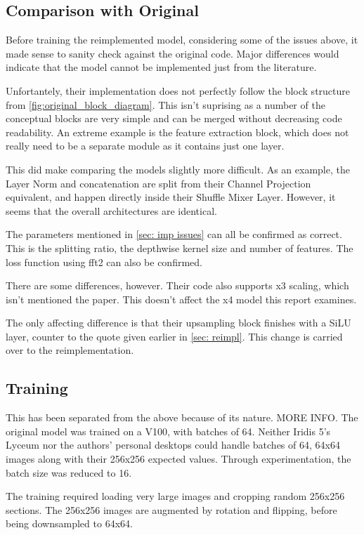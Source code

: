 \documentclass{article}
\begin{document}
    \subsection{Comparison with Original}

    Before training the reimplemented model, considering some of the issues above, it made sense to sanity check against the original code. Major differences would indicate that the model cannot be implemented just from the literature. 

    Unfortantely, their implementation does not perfectly follow the block structure from \cref{fig:original_block_diagram}. This isn't suprising as a number of the conceptual blocks are very simple and can be merged without decreasing code readability. An extreme example is the feature extraction block, which does not really need to be a separate module as it contains just one layer. 

    This did make comparing the models slightly more difficult. As an example, the Layer Norm and concatenation are split from their Channel Projection equivalent, and happen directly inside their Shuffle Mixer Layer. However, it seems that the overall architectures are identical.

    The parameters mentioned in \cref{sec: imp issues} can all be confirmed as correct. This is the splitting ratio, the depthwise kernel size and number of features. The loss function using fft2 can also be confirmed.

    There are some differences, however. Their code also supports x3 scaling, which isn't mentioned the paper. This doesn't affect the x4 model this report examines.

    The only affecting difference is that their upsampling block finishes with a SiLU layer, counter to the quote given earlier in \cref{sec: reimpl}. This change is carried over to the reimplementation.

    \subsection{Training}

    This has been separated from the above because of its nature. MORE INFO. The original model was trained on a V100, with batches of 64. Neither Iridis 5's Lyceum nor the authors' personal desktops could handle batches of 64, 64x64 images along with their 256x256 expected values. Through experimentation, the batch size was reduced to 16.

    The training required loading very large images and cropping random 256x256 sections. The 256x256 images are augmented by rotation and flipping, before being downsampled to 64x64. 
    
\end{document}
